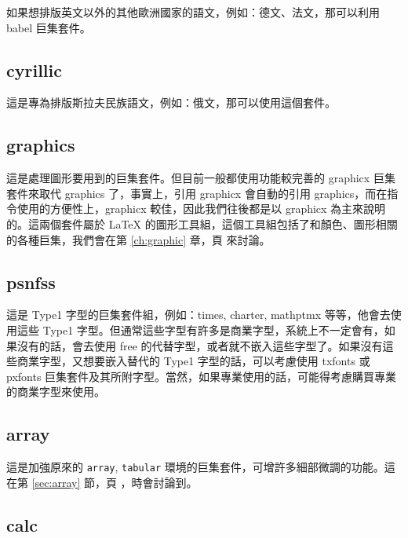 如果想排版英文以外的其他歐洲國家的語文，例如：德文、法文，那可以利用 \textsf{babel} 巨集套件。

\subsection{cyrillic}

這是專為排版斯拉夫民族語文，例如：俄文，那可以使用這個套件。

\subsection{graphics}

這是處理圖形要用到的巨集套件。但目前一般都使用功能較完善的 \textsf{graphicx} 巨集套件來取代 \textsf{graphics} 了，事實上，引用 \textsf{graphicx} 會自動的引用 \textsf{graphics}，而在指令使用的方便性上，\textsf{graphicx} 較佳，因此我們往後都是以 \textsf{graphicx} 為主來說明的。這兩個套件屬於 \LaTeX{} 的圖形工具組，這個工具組包括了和顏色、圖形相關的各種巨集，我們會在第 \ref{ch:graphic} 章，頁 \pageref{ch:graphic} 來討論。

\subsection{psnfss}

這是 Type1 字型的巨集套件組，例如：\textsf{times}, \textsf{charter}, \textsf{mathptmx} 等等，他會去使用這些 Type1 字型。但通常這些字型有許多是商業字型，系統上不一定會有，如果沒有的話，會去使用 free 的代替字型，或者就不嵌入這些字型了。如果沒有這些商業字型，又想要嵌入替代的 Type1 字型的話，可以考慮使用 \textsf{txfonts} 或 \textsf{pxfonts} 巨集套件及其所附字型。當然，如果專業使用的話，可能得考慮購買專業的商業字型來使用。

\subsection{array}

這是加強原來的 \texttt{array}, \texttt{tabular} 環境的巨集套件，可增許多細部微調的功能。這在第 \ref{sec:array} 節，頁 \pageref{sec:array}，時會討論到。

\subsection{calc}

